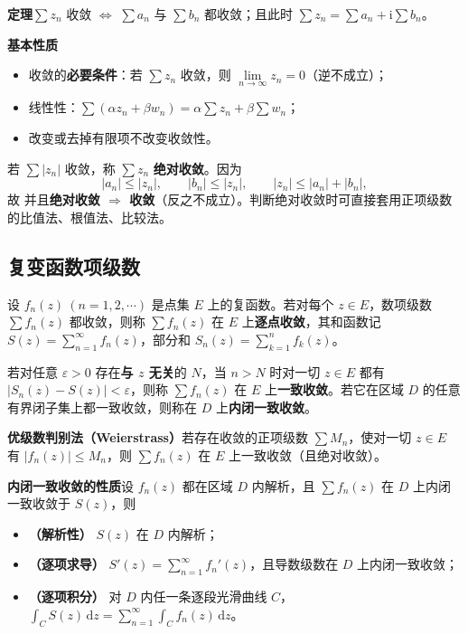 \textbf{定理}\quad \(\sum z_{n}\) 收敛 \(\iff\) \(\sum a_{n}\) 与 \(\sum b_{n}\) 都收敛；且此时 \(\sum z_{n}=\sum a_{n}+\mathrm{i}\sum b_{n}\)。

\textbf{基本性质}
\begin{itemize}[leftmargin=2em]
  \item 收敛的\textbf{必要条件}：若 \(\sum z_{n}\) 收敛，则 \(\lim\limits_{n\to\infty}z_{n}=0\)（逆不成立）；
  \item 线性性：\(\sum(\alpha z_{n}+\beta w_{n})=\alpha\sum z_{n}+\beta\sum w_{n}\)；
  \item 改变或去掉有限项不改变收敛性。
\end{itemize}

若 \(\sum|z_{n}|\) 收敛，称 \(\sum z_{n}\) \textbf{绝对收敛}。因为
\[
|a_{n}|\leqslant|z_{n}|,\qquad |b_{n}|\leqslant|z_{n}|,\qquad |z_{n}|\leqslant|a_{n}|+|b_{n}|,
\]
故
并且\textbf{绝对收敛 \(\Rightarrow\) 收敛}（反之不成立）。判断绝对收敛时可直接套用正项级数的比值法、根值法、比较法。

\subsection{复变函数项级数}
设 \(f_{n}(z)\ (n=1,2,\cdots)\) 是点集 \(E\) 上的复函数。若对每个 \(z\in E\)，数项级数 \(\sum f_{n}(z)\) 都收敛，则称 \(\sum f_{n}(z)\) 在 \(E\) 上\textbf{逐点收敛}，其和函数记 \(S(z)=\sum\limits_{n=1}^{\infty}f_{n}(z)\)，部分和 \(S_{n}(z)=\sum\limits_{k=1}^{n}f_{k}(z)\)。

若对任意 \(\varepsilon>0\) 存在\textbf{与 \(z\) 无关}的 \(N\)，当 \(n>N\) 时对一切 \(z\in E\) 都有 \(|S_{n}(z)-S(z)|<\varepsilon\)，则称 \(\sum f_{n}(z)\) 在 \(E\) 上\textbf{一致收敛}。若它在区域 \(D\) 的任意有界闭子集上都一致收敛，则称在 \(D\) 上\textbf{内闭一致收敛}。

\textbf{优级数判别法（Weierstrass）}\quad 若存在收敛的正项级数 \(\sum M_{n}\)，使对一切 \(z\in E\) 有 \(|f_{n}(z)|\leqslant M_{n}\)，则 \(\sum f_{n}(z)\) 在 \(E\) 上一致收敛（且绝对收敛）。

\textbf{内闭一致收敛的性质}\quad 设 \(f_{n}(z)\) 都在区域 \(D\) 内解析，且 \(\sum f_{n}(z)\) 在 \(D\) 上内闭一致收敛于 \(S(z)\)，则
\begin{itemize}[leftmargin=2em]
  \item \textbf{（解析性）} \(S(z)\) 在 \(D\) 内解析；
  \item \textbf{（逐项求导）} \(S'(z)=\sum\limits_{n=1}^{\infty}f_{n}'(z)\)，且导数级数在 \(D\) 上内闭一致收敛；
  \item \textbf{（逐项积分）} 对 \(D\) 内任一条逐段光滑曲线 \(C\)，\(\displaystyle\int_{C}S(z)\,\mathrm{d}z=\sum_{n=1}^{\infty}\int_{C}f_{n}(z)\,\mathrm{d}z\)。
\end{itemize}

